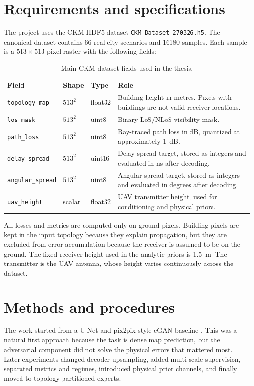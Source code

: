 \section{Requirements and specifications}

The project uses the CKM HDF5 dataset
\texttt{CKM\_Dataset\_270326.h5}. The canonical dataset contains 66 real-city
scenarios and 16180 samples. Each sample is a $513\times513$ pixel raster with
the following fields:

\begin{table}[ht]
\centering
\caption{Main CKM dataset fields used in the thesis.}
\label{tab:dataset_fields_intro}
\begin{tabularx}{\textwidth}{lllX}
\toprule
Field & Shape & Type & Role \\
\midrule
\texttt{topology\_map} & $513^2$ & float32 & Building height in metres. Pixels with buildings are not valid receiver locations. \\
\texttt{los\_mask} & $513^2$ & uint8 & Binary LoS/NLoS visibility mask. \\
\texttt{path\_loss} & $513^2$ & uint8 & Ray-traced path loss in dB, quantized at approximately \SI{1}{dB}. \\
\texttt{delay\_spread} & $513^2$ & uint16 & Delay-spread target, stored as integers and evaluated in ns after decoding. \\
\texttt{angular\_spread} & $513^2$ & uint8 & Angular-spread target, stored as integers and evaluated in degrees after decoding. \\
\texttt{uav\_height} & scalar & float32 & UAV transmitter height, used for conditioning and physical priors. \\
\bottomrule
\end{tabularx}
\end{table}

All losses and metrics are computed only on ground pixels. Building pixels are
kept in the input topology because they explain propagation, but they are
excluded from error accumulation because the receiver is assumed to be on the
ground. The fixed receiver height used in the analytic priors is
\SI{1.5}{m}. The transmitter is the UAV antenna, whose height varies
continuously across the dataset.

\section{Methods and procedures}

The work started from a U-Net and pix2pix-style cGAN baseline
\cite{isola2017pix2pix}. This was a natural first approach because the task is
dense map prediction, but the adversarial component did not solve the physical
errors that mattered most. Later experiments changed decoder upsampling, added
multi-scale supervision, separated metrics and regimes, introduced physical
prior channels, and finally moved to topology-partitioned experts.

